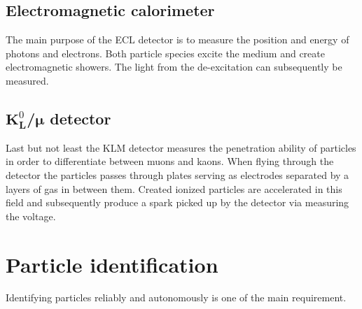 \subsection{Electromagnetic calorimeter}
\label{subsec:detector_system_electromagnetic_calorimeter}

The main purpose of the ECL detector is to measure the position and energy of photons and electrons. Both particle species excite the medium and create electromagnetic showers. The light from the de-excitation can subsequently be measured.

\subsection{$\boldsymbol{K}^0_{\boldsymbol{L}}$/$\boldsymbol{\mu}$ detector}
\label{subsec:detector_system_k0lmu}

Last but not least the KLM detector measures the penetration ability of particles in order to differentiate between muons and kaons. When flying through the detector the particles passes through plates serving as electrodes separated by a layers of gas in between them. Created ionized particles are accelerated in this field and subsequently produce a spark picked up by the detector via measuring the voltage.

\section{Particle identification}
\label{sec:particle_identification}

Identifying particles reliably and autonomously is one of the main requirement.
